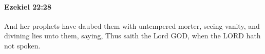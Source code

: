 
		\paragraph{Ezekiel 22:28} %
			\label{EZEKIEL-22-28}

			And her prophets have daubed them with untempered morter, seeing vanity, and divining lies unto them, saying, Thus saith the Lord GOD, when the LORD hath not spoken.


